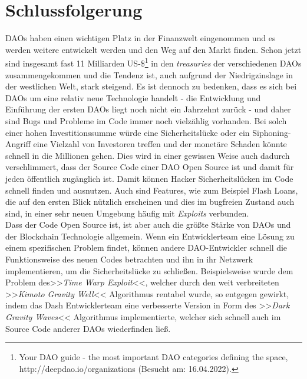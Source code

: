 \documentclass[a4paper,12pt]{report}
\begin{document}
	
	\chapter{Schlussfolgerung}
	
	DAOs haben einen wichtigen Platz in der Finanzwelt eingenommen und es werden weitere entwickelt werden und den Weg auf den Markt finden. Schon jetzt sind insgesamt fast 11 Milliarden US-\$\footnote{\hspace{0.5em}\begin{minipage}[t]{13cm}Your DAO guide - the most important DAO categories defining the space, http://deepdao.io/organizations (Besucht am: 16.04.2022).\end{minipage}} in den \textit{treasuries} der verschiedenen DAOs zusammengekommen und die Tendenz ist, auch aufgrund der Niedrigzinslage in der westlichen Welt, stark steigend. Es ist dennoch zu bedenken, dass es sich bei DAOs um eine relativ neue Technologie handelt - die Entwicklung und Einführung der ersten DAOs liegt noch nicht ein Jahrzehnt zurück - und daher sind Bugs und Probleme im Code immer noch vielzählig vorhanden. Bei solch einer hohen Investitionssumme würde eine Sicherheitslücke oder ein Siphoning-Angriff eine Vielzahl von Investoren treffen und der monetäre Schaden könnte schnell in die Millionen gehen. Dies wird in einer gewissen Weise auch dadurch verschlimmert, dass der Source Code einer DAO Open Source ist und damit für jeden öffentlich zugänglich ist. Damit können Hacker Sicherheitslücken im Code schnell finden und ausnutzen. Auch sind Features, wie zum Beispiel Flash Loans, die auf den ersten Blick nützlich erscheinen und dies im bugfreien Zustand auch sind, in einer sehr neuen Umgebung häufig mit \textit{Exploits} verbunden. \\
	Dass der Code Open Source ist, ist aber auch die größte Stärke von DAOs und der Blockchain Technologie allgemein. Wenn ein Entwicklerteam eine Lösung zu einem spezifischen Problem findet, können andere DAO-Entwickler schnell die Funktionsweise des neuen Codes betrachten und ihn in ihr Netzwerk implementieren, um die Sicherheitslücke zu schließen. Beispielsweise wurde dem Problem des>>\textit{Time Warp Exploit}<<, welcher durch den weit verbreiteten >>\textit{Kimoto Gravity Well}<< Algorithmus rentabel wurde, so entgegen gewirkt, indem das Dash Entwicklerteam eine verbesserte Version in Form des >>\textit{Dark Gravity Waves}<< Algorithmus implementierte, welcher sich schnell auch im Source Code anderer DAOs wiederfinden ließ. \\
\end{document}
